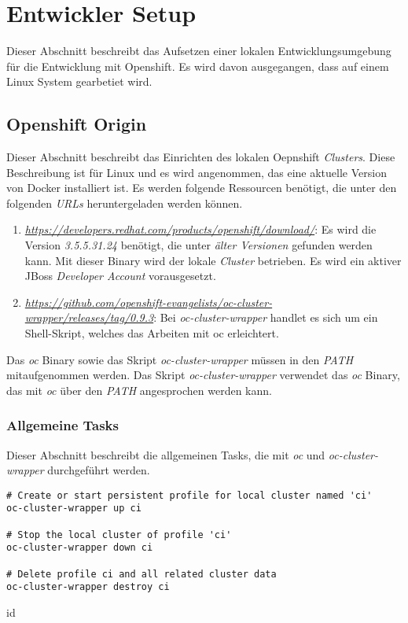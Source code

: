 \section{Entwickler Setup}
\label{sec:dev-setup}
Dieser Abschnitt beschreibt das Aufsetzen einer lokalen Entwicklungsumgebung für die Entwicklung mit Openshift. Es wird davon ausgegangen, dass auf einem Linux System gearbetiet wird.

\subsection{Openshift Origin}
Dieser Abschnitt beschreibt das Einrichten des lokalen Oepnshift \emph{Clusters}. Diese Beschreibung ist für Linux und es wird angenommen, das eine aktuelle Version von Docker installiert ist.
\newline
\newline
Es werden folgende Ressourcen benötigt, die unter den folgenden \emph{URLs} heruntergeladen werden können.
\begin{enumerate}
	\item\emph{\url{https://developers.redhat.com/products/openshift/download/}}:
	\newline
	Es wird die Version \emph{3.5.5.31.24} benötigt, die unter \emph{älter Versionen} gefunden werden kann. Mit dieser Binary wird der lokale \emph{Cluster} betrieben. 
	\newline
	Es wird ein aktiver JBoss \emph{Developer Account} vorausgesetzt.
	\item\emph{\url{https://github.com/openshift-evangelists/oc-cluster-wrapper/releases/tag/0.9.3}}:
	\newline
	Bei \emph{oc-cluster-wrapper} handlet es sich um ein Shell-Skript, welches das Arbeiten mit oc erleichtert.
\end{enumerate}
Das \emph{oc} Binary sowie das Skript \emph{oc-cluster-wrapper} müssen in den \emph{PATH} mitaufgenommen werden. Das Skript \emph{oc-cluster-wrapper} verwendet das \emph{oc} Binary, das mit \emph{oc} über den \emph{PATH} angesprochen werden kann.

\subsubsection{Allgemeine Tasks}
Dieser Abschnitt beschreibt die allgemeinen Tasks, die mit \emph{oc} und \emph{oc-cluster-wrapper} durchgeführt werden.

\begin{verbatim}
# Create or start persistent profile for local cluster named 'ci'
oc-cluster-wrapper up ci

# Stop the local cluster of profile 'ci'
oc-cluster-wrapper down ci

# Delete profile ci and all related cluster data
oc-cluster-wrapper destroy ci
\end{verbatim}id




